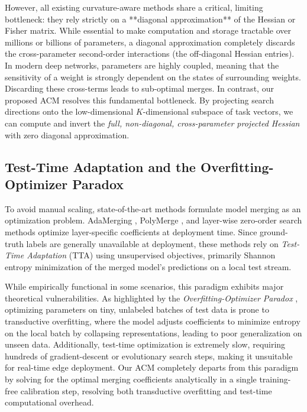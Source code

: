 However, all existing curvature-aware methods share a critical, limiting bottleneck: they rely strictly on a **diagonal approximation** of the Hessian or Fisher matrix. While essential to make computation and storage tractable over millions or billions of parameters, a diagonal approximation completely discards the cross-parameter second-order interactions (the off-diagonal Hessian entries). In modern deep networks, parameters are highly coupled, meaning that the sensitivity of a weight is strongly dependent on the states of surrounding weights. Discarding these cross-terms leads to sub-optimal merges. In contrast, our proposed ACM resolves this fundamental bottleneck. By projecting search directions onto the low-dimensional $K$-dimensional subspace of task vectors, we can compute and invert the \emph{full, non-diagonal, cross-parameter projected Hessian} with zero diagonal approximation.

\subsection{Test-Time Adaptation and the Overfitting-Optimizer Paradox}
To avoid manual scaling, state-of-the-art methods formulate model merging as an optimization problem. AdaMerging \cite{yang2023adamerging}, PolyMerge \cite{polymerge}, and layer-wise zero-order search methods \cite{sanyal2023sanity} optimize layer-specific coefficients at deployment time. Since ground-truth labels are generally unavailable at deployment, these methods rely on \emph{Test-Time Adaptation} (TTA) using unsupervised objectives, primarily Shannon entropy minimization of the merged model's predictions on a local test stream. 

While empirically functional in some scenarios, this paradigm exhibits major theoretical vulnerabilities. As highlighted by the \emph{Overfitting-Optimizer Paradox} \cite{regcalmerge}, optimizing parameters on tiny, unlabeled batches of test data is prone to transductive overfitting, where the model adjusts coefficients to minimize entropy on the local batch by collapsing representations, leading to poor generalization on unseen data. Additionally, test-time optimization is extremely slow, requiring hundreds of gradient-descent or evolutionary search steps, making it unsuitable for real-time edge deployment. Our ACM completely departs from this paradigm by solving for the optimal merging coefficients analytically in a single training-free calibration step, resolving both transductive overfitting and test-time computational overhead.
